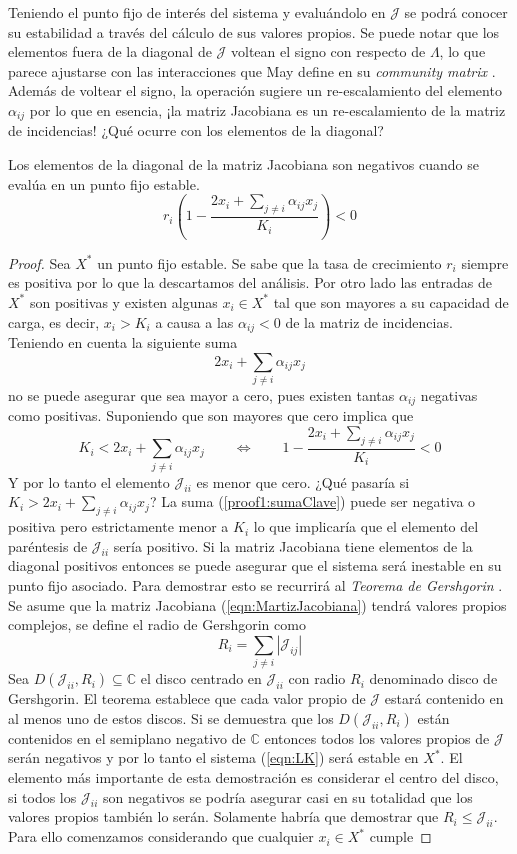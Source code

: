 Teniendo el punto fijo de interés del sistema y evaluándolo en $\mathcal{J}$ se podrá conocer su estabilidad a través del cálculo de sus valores propios. Se puede notar que los elementos fuera de la diagonal de $\mathcal{J}$ voltean el signo con respecto de $\Lambda$, lo que parece ajustarse con las interacciones que May define en su \textit{community matrix} \cite{may2019stability}. Además de voltear el signo, la operación sugiere un re-escalamiento del elemento $\alpha_{ij}$ por lo que en esencia, ¡la matriz Jacobiana es un re-escalamiento de la matriz de incidencias! ¿Qué ocurre con los elementos de la diagonal?
\begin{proposición}\label{prop:DiagonalI}
	Los elementos de la diagonal de la matriz Jacobiana son negativos cuando se evalúa en un punto fijo estable.
	$$
	r_i \left (1-\frac{2x_i+\sum_{j\neq i}\alpha_{ij}x_j}{K_i}\right )<0
	$$	
	\begin{proof}
		Sea $X^*$ un punto fijo estable. Se sabe que la tasa de crecimiento $r_i$ siempre es positiva por lo que la descartamos del análisis. Por otro lado las entradas de $X^*$ son positivas y existen algunas $x_i\in X^*$ tal que son mayores a su capacidad de carga, es decir, $x_i>K_i$ a causa a las $\alpha_{ij}<0$ de la matriz de incidencias. Teniendo en cuenta la siguiente suma
		\begin{equation}\label{proof1:sumaClave}
			2x_i+\sum_{j\neq i}\alpha_{ij}x_j
		\end{equation}
		no se puede asegurar que sea mayor a cero, pues existen tantas $\alpha_{ij}$ negativas como positivas. Suponiendo que son mayores que cero implica que
		$$K_i<2x_i+\sum_{j\neq i}\alpha_{ij}x_j\qquad\Longleftrightarrow\qquad 1-\frac{2x_i+\sum_{j\neq i}\alpha_{ij}x_j}{K_i}<0$$
		Y por lo tanto el elemento $\mathcal{J}_{ii}$ es menor que cero. ¿Qué pasaría si $K_i>2x_i+\sum_{j\neq i}\alpha_{ij}x_j$? La suma (\ref{proof1:sumaClave}) puede ser negativa o positiva pero estrictamente menor a $K_i$ lo que implicaría que el elemento del paréntesis de $\mathcal{J}_{ii}$ sería positivo. Si la matriz Jacobiana tiene elementos de la diagonal positivos entonces se puede asegurar que el sistema será inestable en su punto fijo asociado. Para demostrar esto se recurrirá al \textit{Teorema de Gershgorin} \cite{GershgorinTheorem}. Se asume que la matriz Jacobiana (\ref{eqn:MartizJacobiana}) tendrá valores propios complejos, se define el radio de Gershgorin como
		$$R_i=\sum_{j\neq i}|\mathcal{J}_{ij}|$$
		Sea $D(\mathcal{J}_{ii},R_i)\subseteq\mathbb{C}$ el disco centrado en $\mathcal{J}_{ii}$ con radio $R_i$ denominado disco de Gershgorin. El teorema establece que cada valor propio de $\mathcal{J}$ estará contenido en al menos uno de estos discos. Si se demuestra que los $D(\mathcal{J}_{ii},R_i)$ están contenidos en el semiplano negativo de $\mathbb{C}$ entonces todos los valores propios de $\mathcal{J}$ serán negativos y por lo tanto el sistema (\ref{eqn:LK}) será estable en $X^*$. El elemento más importante de esta demostración es considerar el centro del disco, si todos los $\mathcal{J}_{ii}$ son negativos se podría asegurar casi en su totalidad que los valores propios también lo serán. Solamente habría que demostrar que $R_i\leq\mathcal{J}_{ii}$. Para ello comenzamos considerando que cualquier $x_i\in X^*$ cumple

\end{proof}
\end{proposición}
